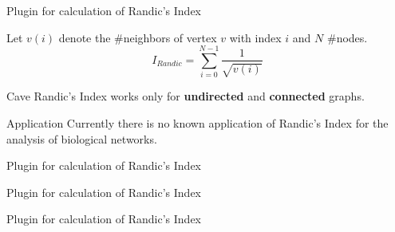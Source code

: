 \begin{frame}{Plugin for calculation of Randic's Index}
\begin{definition}
Let $v(i)$ denote the \#neighbors of vertex $v$ with index $i$ and $N$ \#nodes.
\begin{equation}
I_{Randic} = \sum_{i=0}^{N-1} \frac{1}{\sqrt{v(i)}}
\end{equation}
\end{definition}
\begin{alertblock}{Cave}
Randic's Index works only for \textbf{undirected} and \textbf{connected} graphs.
\end{alertblock}
\pause
\begin{exampleblock}{Application}
Currently there is no known application of Randic's Index for the analysis of biological networks.
\end{exampleblock}
\end{frame}
\begin{frame}{Plugin for calculation of Randic's Index}

\end{frame}
\begin{frame}{Plugin for calculation of Randic's Index}

\end{frame}
\begin{frame}{Plugin for calculation of Randic's Index}

\end{frame}
